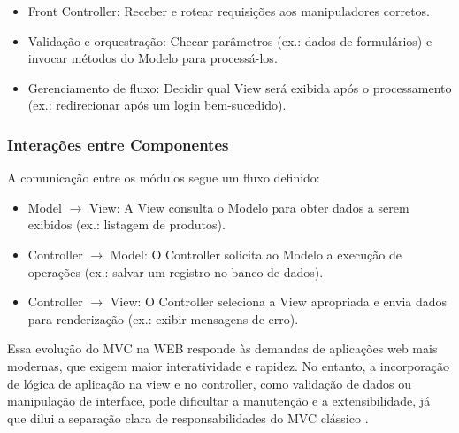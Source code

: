                 \begin{itemize}
                    \item Front Controller: Receber e rotear requisições aos manipuladores corretos.
                    \item Validação e orquestração: Checar parâmetros (ex.: dados de formulários) e invocar métodos do Modelo para processá-los.
                    \item Gerenciamento de fluxo: Decidir qual View será exibida após o processamento (ex.: redirecionar após um login bem-sucedido).
                \end{itemize}
        
                \subsubsection{Interações entre Componentes}
                \par A comunicação entre os módulos segue um fluxo definido:
        
                \begin{itemize}
                    \item Model $\rightarrow$ View: A View consulta o Modelo para obter dados a serem exibidos (ex.: listagem de produtos).
                    \item Controller $\rightarrow$ Model: O Controller solicita ao Modelo a execução de operações (ex.: salvar um registro no banco de dados).
                    \item Controller $\rightarrow$ View: O Controller seleciona a View apropriada e envia dados para renderização (ex.: exibir mensagens de erro).
                \end{itemize}
                
        \par Essa evolução do MVC na WEB responde às demandas de aplicações web mais modernas, que exigem maior interatividade e rapidez. No entanto, a incorporação de lógica de aplicação na view e no controller, como validação de dados ou manipulação de interface, pode dificultar a manutenção e a extensibilidade, já que dilui a separação clara de responsabilidades do MVC clássico \cite{inproceedings:grove:2011}.
        